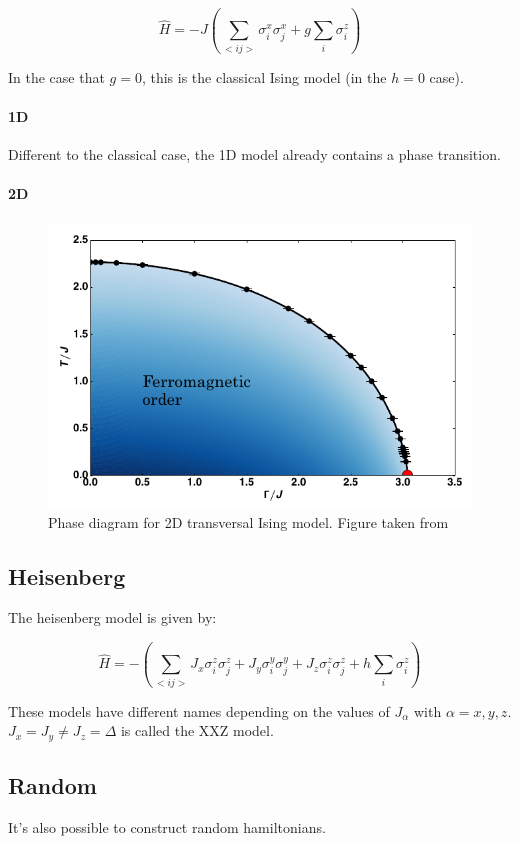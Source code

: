 \begin{equation}
    \hat{H} = -J \left (  \sum_{<i j>} \sigma^x_i \sigma^x_j + g \sum_i \sigma^z_i \right )
\end{equation}

In the case that $g=0$, this is the classical Ising model (in the $h=0$ case).

\paragraph{1D}
Different to the classical case, the 1D model already contains a phase transition.

\paragraph{2D}

\begin{figure}
    \center
    \includegraphics[width=\textwidth]{Figuren/phsyics/2disingphase.png}
    \caption{Phase diagram for 2D transversal Ising model. Figure taken from \cite{Hesselmann2016}}
    \label{2dtisingphasediag}
\end{figure}

\subsection{Heisenberg}

The heisenberg model is given by:

\begin{equation}
    \hat{H} =  -\left( \sum_{<i j>} J_x \sigma^z_i \sigma^z_j + J_y \sigma^y_i \sigma^y_j+ J_z \sigma^z_i \sigma^z_j + h \sum_i \sigma^z_i \right )
\end{equation}

These models have different names depending on the values of $J_{\alpha} $ with $\alpha=x,y,z$. $J_x = J_y \neq J_z = \Delta$ is called the XXZ model.

\subsection{Random}
It's also possible to construct random hamiltonians. 